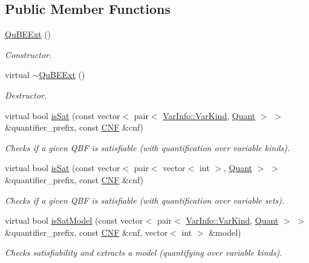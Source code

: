 \subsection*{Public Member Functions}
\begin{DoxyCompactItemize}
\item 
\hyperlink{classQuBEExt_ab433b787109ae43f6e42dbed855bc6fa}{Qu\-B\-E\-Ext} ()
\begin{DoxyCompactList}\small\item\em Constructor. \end{DoxyCompactList}\item 
virtual \hyperlink{classQuBEExt_a0e070d528067724a14f2835b751d41cd}{$\sim$\-Qu\-B\-E\-Ext} ()
\begin{DoxyCompactList}\small\item\em Destructor. \end{DoxyCompactList}\item 
virtual bool \hyperlink{classExtQBFSolver_abec25b97170b79b42b85d1d4ec825a39}{is\-Sat} (const vector$<$ pair$<$ \hyperlink{classVarInfo_a64d1da76cf84fe674e5fef9764ef11cf}{Var\-Info\-::\-Var\-Kind}, \hyperlink{classQBFSolver_ac091e263cb55286cc07b2451bcf4d3c7}{Quant} $>$ $>$ \&quantifier\-\_\-prefix, const \hyperlink{classCNF}{C\-N\-F} \&cnf)
\begin{DoxyCompactList}\small\item\em Checks if a given Q\-B\-F is satisfiable (with quantification over variable kinds). \end{DoxyCompactList}\item 
virtual bool \hyperlink{classExtQBFSolver_adc1bacec3307200dd90b260789e4c808}{is\-Sat} (const vector$<$ pair$<$ vector$<$ int $>$, \hyperlink{classQBFSolver_ac091e263cb55286cc07b2451bcf4d3c7}{Quant} $>$ $>$ \&quantifier\-\_\-prefix, const \hyperlink{classCNF}{C\-N\-F} \&cnf)
\begin{DoxyCompactList}\small\item\em Checks if a given Q\-B\-F is satisfiable (with quantification over variable sets). \end{DoxyCompactList}\item 
virtual bool \hyperlink{classExtQBFSolver_ad66c53343ce9c03eea6e4b5e7753f1b3}{is\-Sat\-Model} (const vector$<$ pair$<$ \hyperlink{classVarInfo_a64d1da76cf84fe674e5fef9764ef11cf}{Var\-Info\-::\-Var\-Kind}, \hyperlink{classQBFSolver_ac091e263cb55286cc07b2451bcf4d3c7}{Quant} $>$ $>$ \&quantifier\-\_\-prefix, const \hyperlink{classCNF}{C\-N\-F} \&cnf, vector$<$ int $>$ \&model)
\begin{DoxyCompactList}\small\item\em Checks satisfiability and extracts a model (quantifying over variable kinds). \end{DoxyCompactList}\item 

\end{DoxyCompactItemize}
